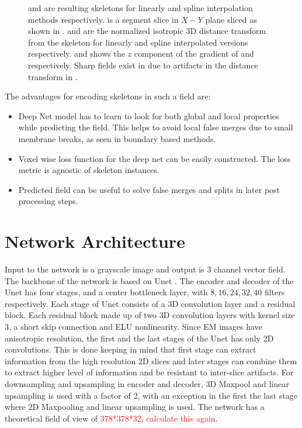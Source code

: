\begin{figure}[htpb]
\begin{subfigure}[b]{\mywidth}
		\caption{\label{fig:grad_spline}}
	\end{subfigure}
	\caption{  and  are resulting skeletons for linearly and spline interpolation methods respectively.  is a segment slice in $X-Y$ plane sliced as shown in .  and  are the normalized isotropic 3D distance transform from the skeleton for linearly and spline interpolated versions respectively.  and  shows the $z$ component of the gradient of  and  respectively. Sharp fields exist in  due to artifacts in the distance transform in .}
	\label{fig:splineInterpolation}
\end{figure}


The advantages for encoding skeletons in such a field are:
\begin{itemize}
	\item Deep Net model has to learn to look for both global and local properties while predicting the field. This helps to avoid local false merges due to small membrane breaks, as seen in boundary based methods.
	\item Voxel wise loss function for the deep net can be easily constructed. The loss metric is agnostic of skeleton instances.
	\item Predicted field can be useful to solve false merges and splits in later post processing steps.
\end{itemize}

\section{Network Architecture}
Input to the network is a grayscale image and output is 3 channel vector field.
The backbone of the network is based on Unet \cite{ronneberger2015}. The encoder and decoder of the Unet has four stages, and a center bottleneck layer, with $8, 16, 24, 32, 40$ filters respectively. Each stage of Unet consists of a 3D convolution layer and a residual block. Each residual block made up of two 3D convolution layers with kernel size 3, a short skip connection and ELU nonlinearity. Since EM images have anisotropic resolution, the first and the last stages of the Unet has only 2D convolutions. This is done keeping in mind that first stage can extract information from the high resolution 2D slices and later stages can combine them to extract higher level of information and be resistant to inter-slice artifacts. For downsampling and upsampling in encoder and decoder, 3D Maxpool and linear upsampling is used with a factor of 2, with an exception in the first the last stage where 2D Maxpooling and linear upsampling is used. The network has a theoretical field of view of \textcolor{red}{378*378*32, calculate this again}.  


